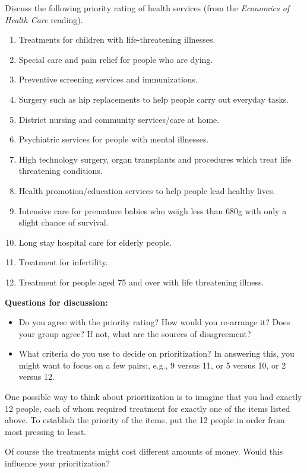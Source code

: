 
Discuss the following priority rating of health services (from the {\em Economics of Health Care} reading).

\begin{enumerate}
\item Treatments for children with life-threatening illnesses.
\item Special care and pain relief for people who are dying.
\item Preventive screening services and immunizations.
\item Surgery such as hip replacements to help people carry out everyday tasks.
\item District nursing and community services/care at home.
\item Psychiatric services for people with mental illnesses.
\item High technology surgery, organ transplants and procedures which treat life threatening conditions.
\item Health promotion/education services to help people lead healthy lives.
\item Intensive care for premature babies who weigh less than 680g with only a slight chance of survival.
\item Long stay hospital care for elderly people.
\item Treatment for infertility.
\item Treatment for people aged 75 and over with life threatening illness.
\end{enumerate}

{\bf Questions for discussion:} 
\begin{itemize}
\item Do you agree with the priority rating? How would you re-arrange it?  Does your group agree?  If not, what are the sources of disagreement?
\item What criteria do you use to decide on prioritization?  In answering this, you might want to focus on a few pairs:, e.g., 9 versus 11, or 5 versus 10, or 2 versus 12.
\end{itemize}
\bigskip

One possible way to think about prioritization is to imagine that you had
exactly 12 people, each of whom required treatment for exactly
one of the items listed above.  To establish the priority of the
items, put the 12 people in order from most pressing to least.

\bigskip

Of course the treatments might cost different amounts of money.  Would
this influence your prioritization?

